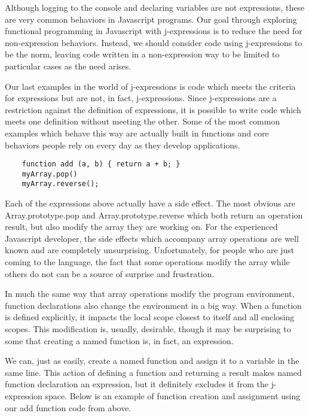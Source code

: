 \documentclass[a4paper,12pt,twoside]{book}
\begin{document}
 Although logging to the console and declaring variables are not expressions, these are very common behaviors in Javascript programs. Our goal through exploring functional programming in Javascript with j-expressions is to reduce the need for non-expression behaviors. Instead, we should consider code using j-expressions to be the norm, leaving code written in a non-expression way to be limited to particular cases as the need arises.
 
 Our last examples in the world of j-expressions is code which meets the criteria for expressions but are not, in fact, j-expressions.  Since j-expressions are a restriction against the definition of expressions, it is possible to write code which meets one definition without meeting the other. Some of the most common examples which behave this way are actually built in functions and core behaviors people rely on every day as they develop applications.
 
\begin{lstlisting}
    function add (a, b) { return a + b; }
    myArray.pop()
    myArray.reverse();
\end{lstlisting}
 
 Each of the expressions above actually have a side effect. The most obvious are Array.prototype.pop and Array.prototype.reverse which both return an operation result, but also modify the array they are working on.  For the experienced Javascript developer, the side effects which accompany array operations are well known and are completely unsurprising. Unfortunately, for people who are just coming to the language, the fact that some operations modify the array while others do not can be a source of surprise and frustration.
 
 In much the same way that array operations modify the program environment, function declarations also change the environment in a big way. When a function is defined explicitly, it impacts the local scope closest to itself and all enclosing scopes. This modification is, usually, desirable, though it may be surprising to some that creating a named function is, in fact, an expression.
 
 We can, just as easily, create a named function and assign it to a variable in the same line. This action of defining a function and returning a result makes named function declaration an expression, but it definitely excludes it from the j-expression space.  Below is an example of function creation and assignment using our add function code from above.
\end{document}
